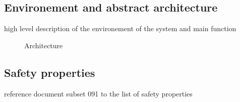 
\subsection{Environement and abstract architecture}
high level description of the environement  of the system  and main function

\begin{figure}[h]
  \centering
  \caption{Architecture}
  \label{fig:architecture}
\end{figure}

\tbc

\subsection{Safety properties}
reference document subset 091 to the list of safety properties


\tbc
